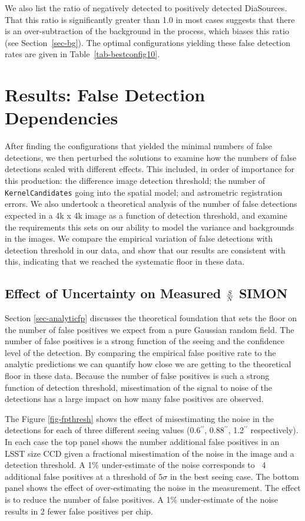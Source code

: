 \documentclass[prd, nofootinbib, floatfix, 11pt,tightenlines,times]{article}
\begin{document}
We also list the ratio of negatively detected to positively detected
DiaSources.  That this ratio is significantly greater than 1.0 in most
cases suggests that there is an over-subtraction of the background in
the process, which biases this ratio (see Section~\ref{sec-bg}).  The
optimal configurations yielding these false detection rates are given
in Table~\ref{tab-bestconfig10}.

\section{Results: False Detection Dependencies}

After finding the configurations that yielded the minimal numbers of
false detections, we then perturbed the solutions to examine how the
numbers of false detections scaled with different effects.  This
included, in order of importance for this production: the difference
image detection threshold; the number of {\tt KernelCandidates} going
into the spatial model; and astrometric registration errors.  We also
undertook a theoretical analysis of the number of false detections
expected in a 4k x 4k image as a function of detection threshold, and
examine the requirements this sets on our ability to model the
variance and backgrounds in the images.  We compare the empirical
variation of false detections with detection threshold in our data,
and show that our results are consistent with this, indicating that we
reached the systematic floor in these data.

\subsection{Effect of Uncertainty on Measured ${S}\over{N}$ {\bf SIMON}}

Section \ref{sec-analyticfp} discusses the theoretical foundation 
that sets the floor on the number of false positives we expect from a 
pure Gaussian random field.  The number of false positives is a strong
function of the seeing and the confidence level of the detection.  
By comparing the empirical false positive rate to the analytic predictions
we can quantify how close we are getting to the theoretical floor in these
data.  Because the number of false positives is such a strong function of
detection threshold, misestimation of the signal to noise of the detections
has a large impact on how many false positives are observed.  

The Figure \ref{fig-fpthresh} shows the 
effect of misestimating the noise in the detections for each of three different
seeing values (0.6$^{\prime\prime}$, 0.88$^{\prime\prime}$, 1.2$^{\prime\prime}$ respectively).  In each case the top panel shows
the number additional false positives in an LSST size CCD given a fractional misestimation
of the noise in the image and a detection threshold.  A 1\% under-estimate of the noise
corresponds to ~4 additional false positives at a threshold of $5\sigma$ in the best seeing case.  
The bottom panel shows 
the effect of over-estimating the noise in the measurement.  The effect is to reduce
the number of false positives.  A 1\% under-estimate of the noise results in 2 fewer false positives
per chip.
\end{document}

